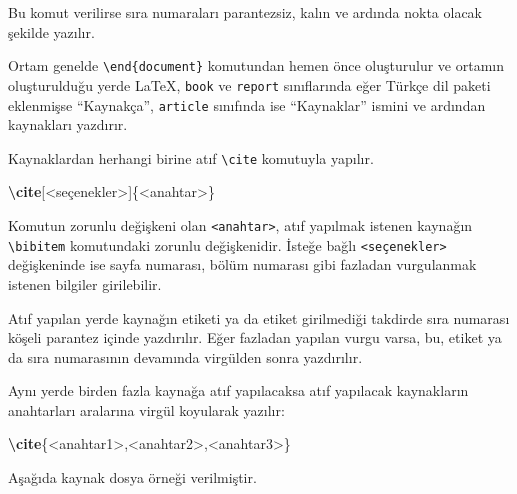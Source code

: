 \documentclass[
  10pt,
]{scrbook}
\newenvironment{Shaded}{\begin{snugshade}}{\end{snugshade}}
\newcommand{\ExtensionTok}[1]{#1}
\newcommand{\KeywordTok}[1]{\textcolor[rgb]{0.13,0.29,0.53}{\textbf{#1}}}
\newcommand{\NormalTok}[1]{#1}
\theoremstyle{definition}
\theoremstyle{definition}
\theoremstyle{definition}
\theoremstyle{definition}
\theoremstyle{remark}
\begin{document}
Bu komut verilirse sıra numaraları parantezsiz, kalın ve ardında nokta olacak şekilde yazılır.

Ortam genelde \texttt{\textbackslash{}end\{document\}} komutundan hemen önce oluşturulur ve ortamın oluşturulduğu yerde LaTeX, \texttt{book} ve \texttt{report} sınıflarında eğer Türkçe dil paketi eklenmişse ``Kaynakça'', \texttt{article} sınıfında ise ``Kaynaklar'' ismini ve ardından kaynakları yazdırır.

Kaynaklardan herhangi birine atıf \texttt{\textbackslash{}cite} komutuyla yapılır.

\begin{Shaded}
\begin{Highlighting}[]
\KeywordTok{\textbackslash{}cite}\NormalTok{[\textless{}seçenekler\textgreater{}]\{}\ExtensionTok{\textless{}anahtar\textgreater{}}\NormalTok{\}}
\end{Highlighting}
\end{Shaded}

Komutun zorunlu değişkeni olan \texttt{\textless{}anahtar\textgreater{}}, atıf yapılmak istenen kaynağın \texttt{\textbackslash{}bibitem} komutundaki zorunlu değişkenidir. İsteğe bağlı \texttt{\textless{}seçenekler\textgreater{}} değişkeninde ise sayfa numarası, bölüm numarası gibi fazladan vurgulanmak istenen bilgiler girilebilir.

Atıf yapılan yerde kaynağın etiketi ya da etiket girilmediği takdirde sıra numarası köşeli parantez içinde yazdırılır. Eğer fazladan yapılan vurgu varsa, bu, etiket ya da sıra numarasının devamında virgülden sonra yazdırılır.

Aynı yerde birden fazla kaynağa atıf yapılacaksa atıf yapılacak kaynakların anahtarları aralarına virgül koyularak yazılır:

\begin{Shaded}
\begin{Highlighting}[]
\KeywordTok{\textbackslash{}cite}\NormalTok{\{}\ExtensionTok{\textless{}anahtar1\textgreater{},\textless{}anahtar2\textgreater{},\textless{}anahtar3\textgreater{}}\NormalTok{\}}
\end{Highlighting}
\end{Shaded}

Aşağıda kaynak dosya örneği verilmiştir.
\end{document}
